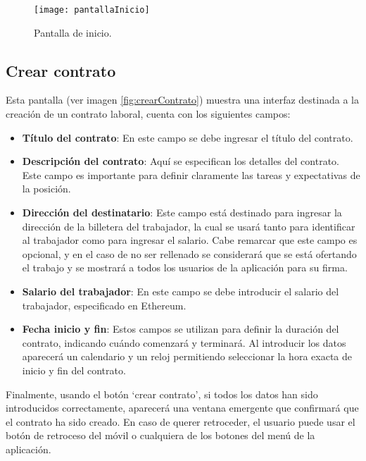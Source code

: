 \begin{figure}[h]
	\centering
	\texttt{[image: pantallaInicio]}
	\caption[Pantalla inicio]{Pantalla de inicio.}
	\label{fig:pantallaInicio}
\end{figure}


\subsection{Crear contrato}
\label{sec:CrearContrato}

Esta pantalla (ver imagen \ref{fig:crearContrato}) muestra una interfaz destinada a la creación de un contrato laboral, cuenta con los siguientes campos:

\begin{itemize}

\item \textbf{Título del contrato}: En este campo se debe ingresar el título del contrato.

\item \textbf{Descripción del contrato}: Aquí se especifican los detalles del contrato. Este campo es importante para definir claramente las tareas y expectativas de la posición.

\item \textbf{Dirección del destinatario}: Este campo está destinado para ingresar la dirección de la billetera del trabajador, la cual se usará tanto para identificar al trabajador como para ingresar el salario.
Cabe remarcar que este campo es opcional, y en el caso de no ser rellenado se considerará que se está ofertando el trabajo y se mostrará a todos los usuarios de la aplicación para su firma.

\item \textbf{Salario del trabajador}: En este campo se debe introducir el salario del trabajador, especificado en Ethereum.

\item \textbf{Fecha inicio y fin}: Estos campos se utilizan para definir la duración del contrato, indicando cuándo comenzará y terminará. Al introducir los datos aparecerá un calendario y un reloj permitiendo seleccionar la hora exacta de inicio y fin del contrato.

\end{itemize}

Finalmente, usando el botón `crear contrato', si todos los datos han sido introducidos correctamente, aparecerá una ventana emergente que confirmará que el contrato ha sido creado.
En caso de querer retroceder, el usuario puede usar el botón de retroceso del móvil o cualquiera de los botones del menú de la aplicación.

